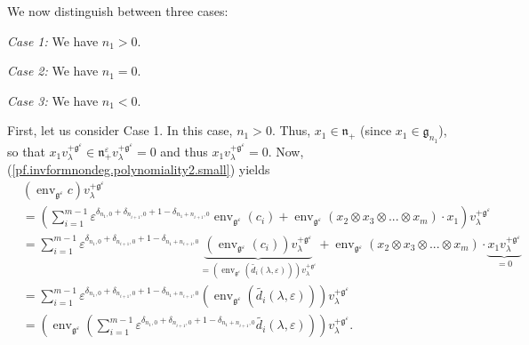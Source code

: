 \documentclass
[numbers=enddot,12pt,final,onecolumn,german,notitlepage]{scrartcl}%
\theoremstyle{definition}
\begin{document}
We now distinguish between three cases:

\textit{Case 1:} We have $n_{1}>0$.

\textit{Case 2:} We have $n_{1}=0$.

\textit{Case 3:} We have $n_{1}<0$.

First, let us consider Case 1. In this case, $n_{1}>0$. Thus, $x_{1}%
\in\mathfrak{n}_{+}$ (since $x_{1}\in\mathfrak{g}_{n_{1}}$), so that
$x_{1}v_{\lambda}^{+\mathfrak{g}^{\varepsilon}}\in\mathfrak{n}_{+}%
^{\varepsilon}v_{\lambda}^{+\mathfrak{g}^{\varepsilon}}=0$ and thus
$x_{1}v_{\lambda}^{+\mathfrak{g}^{\varepsilon}}=0$. Now,
(\ref{pf.invformnondeg.polynomiality2.small}) yields%
\begin{align}
&  \left(  \operatorname*{env}\nolimits_{\mathfrak{g}^{\varepsilon}}c\right)
v_{\lambda}^{+\mathfrak{g}^{\varepsilon}}\nonumber\\
&  =\left(  \sum\limits_{i=1}^{m-1}\varepsilon^{\delta_{n_{1},0}%
+\delta_{n_{i+1},0}+1-\delta_{n_{1}+n_{i+1},0}}\operatorname*{env}%
\nolimits_{\mathfrak{g}^{\varepsilon}}\left(  c_{i}\right)
+\operatorname*{env}\nolimits_{\mathfrak{g}^{\varepsilon}}\left(  x_{2}\otimes
x_{3}\otimes...\otimes x_{m}\right)  \cdot x_{1}\right)  v_{\lambda
}^{+\mathfrak{g}^{\varepsilon}}\nonumber\\
&  =\sum\limits_{i=1}^{m-1}\varepsilon^{\delta_{n_{1},0}+\delta_{n_{i+1}%
,0}+1-\delta_{n_{1}+n_{i+1},0}}\underbrace{\left(  \operatorname*{env}%
\nolimits_{\mathfrak{g}^{\varepsilon}}\left(  c_{i}\right)  \right)
v_{\lambda}^{+\mathfrak{g}^{\varepsilon}}}_{=\left(  \operatorname*{env}%
\nolimits_{\mathfrak{g}^{\varepsilon}}\left(  \widetilde{d_{i}}\left(
\lambda,\varepsilon\right)  \right)  \right)  v_{\lambda}^{+\mathfrak{g}%
^{\varepsilon}}}+\operatorname*{env}\nolimits_{\mathfrak{g}^{\varepsilon}%
}\left(  x_{2}\otimes x_{3}\otimes...\otimes x_{m}\right)  \cdot
\underbrace{x_{1}v_{\lambda}^{+\mathfrak{g}^{\varepsilon}}}_{=0}\nonumber\\
&  =\sum\limits_{i=1}^{m-1}\varepsilon^{\delta_{n_{1},0}+\delta_{n_{i+1}%
,0}+1-\delta_{n_{1}+n_{i+1},0}}\left(  \operatorname*{env}%
\nolimits_{\mathfrak{g}^{\varepsilon}}\left(  \widetilde{d_{i}}\left(
\lambda,\varepsilon\right)  \right)  \right)  v_{\lambda}^{+\mathfrak{g}%
^{\varepsilon}}\nonumber\\
&  =\left(  \operatorname*{env}\nolimits_{\mathfrak{g}^{\varepsilon}}\left(
\sum\limits_{i=1}^{m-1}\varepsilon^{\delta_{n_{1},0}+\delta_{n_{i+1}%
,0}+1-\delta_{n_{1}+n_{i+1},0}}\widetilde{d_{i}}\left(  \lambda,\varepsilon
\right)  \right)  \right)  v_{\lambda}^{+\mathfrak{g}^{\varepsilon}}.
\label{pf.invformnondeg.polynomiality2.small1}%
\end{align}
\end{document}
